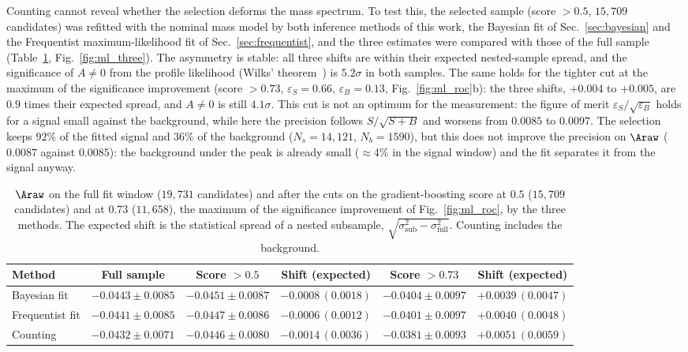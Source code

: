 Counting cannot reveal whether the selection deforms the mass spectrum. To test this, the selected sample (score $>0.5$, $15{,}709$ candidates) was refitted with the nominal mass model by both inference methods of this work, the Bayesian fit of Sec.~\ref{sec:bayesian} and the Frequentist maximum-likelihood fit of Sec.~\ref{sec:frequentist}, and the three estimates were compared with those of the full sample (Table~\ref{tab:three_methods}, Fig.~\ref{fig:ml_three}). The asymmetry is stable: all three shifts are within their expected nested-sample spread, and the significance of $A\neq0$ from the profile likelihood (Wilks' theorem~\cite{wilks}) is $5.2\sigma$ in both samples. The same holds for the tighter cut at the maximum of the significance improvement (score $>0.73$, $\varepsilon_S=0.66$, $\varepsilon_B=0.13$, Fig.~\ref{fig:ml_roc}b): the three shifts, $+0.004$ to $+0.005$, are $0.9$ times their expected spread, and $A\neq0$ is still $4.1\sigma$. This cut is not an optimum for the measurement: the figure of merit $\varepsilon_S/\sqrt{\varepsilon_B}$ holds for a signal small against the background, while here the precision follows $S/\sqrt{S+B}$ and worsens from $0.0085$ to $0.0097$. The selection keeps $92\%$ of the fitted signal and $36\%$ of the background ($N_s=14{,}121$, $N_b=1590$), but this does not improve the precision on $\Araw$ ($0.0087$ against $0.0085$): the background under the peak is already small ($\approx$4\% in the signal window) and the fit separates it from the signal anyway.

\begin{table}[t]
\centering
\begin{tabular}{lccccc}
\toprule
Method & Full sample & Score $>0.5$ & Shift (expected) & Score $>0.73$ & Shift (expected) \\
\midrule
Bayesian fit    & $-0.0443\pm0.0085$ & $-0.0451\pm0.0087$ & $-0.0008\,(0.0018)$ & $-0.0404\pm0.0097$ & $+0.0039\,(0.0047)$ \\
Frequentist fit & $-0.0441\pm0.0085$ & $-0.0447\pm0.0086$ & $-0.0006\,(0.0012)$ & $-0.0401\pm0.0097$ & $+0.0040\,(0.0048)$ \\
Counting        & $-0.0432\pm0.0071$ & $-0.0446\pm0.0080$ & $-0.0014\,(0.0036)$ & $-0.0381\pm0.0093$ & $+0.0051\,(0.0059)$ \\
\bottomrule
\end{tabular}
\caption{$\Araw$ on the full fit window ($19{,}731$ candidates) and after the cuts on the gradient-boosting score at $0.5$ ($15{,}709$ candidates) and at $0.73$ ($11{,}658$), the maximum of the significance improvement of Fig.~\ref{fig:ml_roc}, by the three methods. The expected shift is the statistical spread of a nested subsample, $\sqrt{\sigma_{\mathrm{sub}}^2-\sigma_{\mathrm{full}}^2}$. Counting includes the background.}
\label{tab:three_methods}
\end{table}

